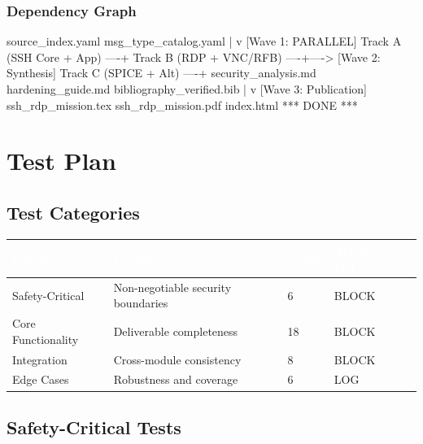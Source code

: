 \documentclass[11pt,letterpaper]{article}
\newcommand{\tableheader}[1]{\textbf{\sffamily\textcolor{white}{#1}}}
\begin{document}
\subsubsection{Dependency Graph}

\begin{asciibox}
  source_index.yaml
  msg_type_catalog.yaml
        |
        v
[Wave 1: PARALLEL]
  Track A (SSH Core + App) ----+
  Track B (RDP + VNC/RFB) ----+----> [Wave 2: Synthesis]
  Track C (SPICE + Alt)   ----+          security_analysis.md
                                         hardening_guide.md
                                         bibliography_verified.bib
                                              |
                                              v
                                    [Wave 3: Publication]
                                    ssh_rdp_mission.tex
                                    ssh_rdp_mission.pdf
                                    index.html
                                    *** DONE ***
\end{asciibox}

\section{Test Plan}

\subsection{Test Categories}

\begin{center}
\begin{tabularx}{\textwidth}{L{3.5cm}XC{2cm}C{2cm}}
\toprule
{}
\tableheader{Category} & \tableheader{Purpose} & \tableheader{Count} & \tableheader{Action on Fail} \\
\midrule
Safety-Critical & Non-negotiable security boundaries & 6 & BLOCK \\
Core Functionality & Deliverable completeness & 18 & BLOCK \\
Integration & Cross-module consistency & 8 & BLOCK \\
Edge Cases & Robustness and coverage & 6 & LOG \\
\bottomrule
\end{tabularx}
\end{center}

\subsection{Safety-Critical Tests}
\end{document}
